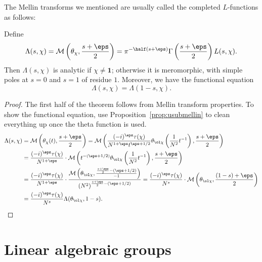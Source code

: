 The Mellin transforms we mentioned are usually
called the completed $L$-functions as follows:
\begin{theorem}
  Define
  \[ \Lambda(s, \chi)
    = \MM\left( \theta_\chi, \frac{s+\eps}{2} \right)
    = \pi^{-\half(s+\eps)}
    \Gamma\left( \frac{s+\eps}{2} \right) L(s, \chi).  \]
  Then $\Lambda(s, \chi)$ is analytic if $\chi \ne \mathbf 1$;
  otherwise it is meromorphic,
  with simple poles at $s = 0$ and $s = 1$ of residue $1$.
  Moreover, we have the functional equation
  \[ \Lambda(s, \chi) = \Lambda(1-s, \chi). \]
\end{theorem}

\begin{proof}
The first half of the theorem follows from Mellin transform properties.
To show the functional equation, use Proposition~\ref{prop:usubmellin}
to clean everything up once the theta function is used.
\begin{align*}
  \Lambda(s, \chi) &= \MM\left(\theta_\chi(t),
    \frac{s+\eps}{2} \right)
  = \MM\left(
    \frac{(-i)^{\eps} \tau(\chi)}{N^{1+\eps} t^{\eps+1/2}}
    \theta_{\ol\chi}
    \left( \frac{1}{N^2} t^{-1} \right),
    \frac{s+\eps}{2} \right) \\
  &= \frac{(-i)^{\eps} \tau(\chi)}{N^{1+\eps}}
    \cdot \MM\left( t^{-(\eps+1/2)}\theta_{\ol\chi}
    \left( \frac{1}{N^2} t^{-1} \right),
    \frac{s+\eps}{2} \right) \\
  &= \frac{(-i)^{\eps} \tau(\chi)}{N^{1+\eps}}
    \cdot \frac{\MM\left( \theta_{\ol\chi},
    \frac{\frac{s+\eps}{2} - (\eps + 1/2)}{-1} \right)}
    {\left( N^2 \right)^{\frac{s+\eps}{2} - (\eps+1/2)}}
  = \frac{(-i)^{\eps} \tau(\chi)}{N^{s}}
    \cdot \MM\left( \theta_{\ol\chi},
    \frac{(1-s)+\eps}{2}\right) \\
  &= \frac{(-i)^{\eps} \tau(\chi)}{N^{s}}
    \Lambda(\theta_{\ol\chi}, 1-s). \qedhere
\end{align*}
\end{proof}

\section{Linear algebraic groups}
